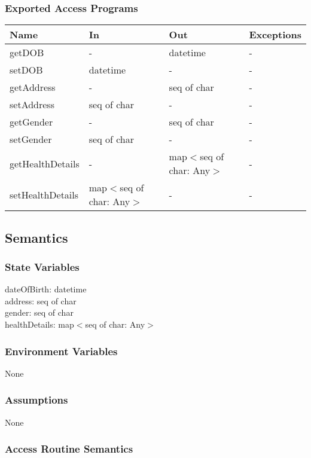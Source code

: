 \documentclass[12pt, titlepage]{article}
\begin{document}
\subsubsection{Exported Access Programs}

\begin{center}
\begin{tabular}{p{4cm} p{4cm} p{4cm} p{4cm}}
\hline
\textbf{Name} & \textbf{In} & \textbf{Out} & \textbf{Exceptions} \\
\hline
getDOB & - & datetime & - \\
\hline
setDOB & datetime & - & - \\
\hline
getAddress & - & seq of char & - \\
\hline
setAddress & seq of char & - & - \\
\hline
getGender & - & seq of char & - \\
\hline
setGender & seq of char & - & - \\
\hline
getHealthDetails & - & map$<$seq of char: Any$>$ & - \\
\hline
setHealthDetails & map$<$seq of char: Any$>$ & - & - \\

\end{tabular}
\end{center}

\subsection{Semantics}

\subsubsection{State Variables}

dateOfBirth: datetime\\
address: seq of char\\
gender: seq of char\\
healthDetails: map$<$seq of char: Any$>$

\subsubsection{Environment Variables}
None

\subsubsection{Assumptions}
None

\subsubsection{Access Routine Semantics}
\end{document}

